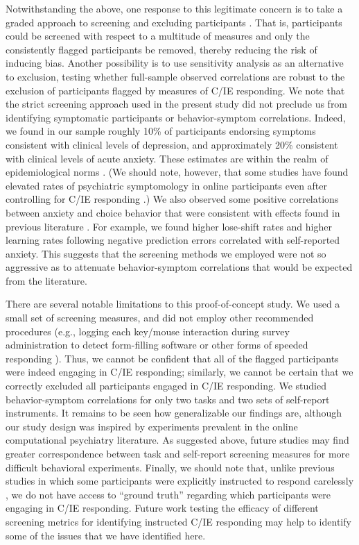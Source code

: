 \documentclass[a4paper,notitlepage,12pt]{article}
\begin{document}
Notwithstanding the above, one response to this legitimate concern is to take a graded approach to screening and excluding participants \cite{Kim2018-ev}. That is, participants could be screened with respect to a multitude of measures and only the consistently flagged participants be removed, thereby reducing the risk of inducing bias. Another possibility is to use sensitivity analysis as an alternative to exclusion, testing whether full-sample observed correlations are robust to the exclusion of participants flagged by measures of C/IE responding. We note that the strict screening approach used in the present study did not preclude us from identifying symptomatic participants or behavior-symptom correlations. Indeed, we found in our sample roughly 10\% of participants endorsing symptoms consistent with clinical levels of depression, and approximately 20\% consistent with clinical levels of acute anxiety. These estimates are within the realm of epidemiological norms \cite{kessler2012twelve, lowe2008validation, yarrington2021impact}. (We should note, however, that some studies have found elevated rates of psychiatric symptomology in online participants even after controlling for C/IE responding \cite{ophir2020turker}.) We also observed some positive correlations between anxiety and choice behavior that were consistent with effects found in previous literature \cite{huang2017computational, harle2017anhedonia, garrett2018updating}. For example, we found higher lose-shift rates and higher learning rates following negative prediction errors correlated with self-reported anxiety. This suggests that the screening methods we employed were not so aggressive as to attenuate behavior-symptom correlations that would be expected from the literature. 

There are several notable limitations to this proof-of-concept study. We used a small set of screening measures, and did not employ other recommended procedures (e.g., logging each key/mouse interaction during survey administration to detect form-filling software or other forms of speeded responding \cite{buchanan2018methods}). Thus, we cannot be confident that all of the flagged participants were indeed engaging in C/IE responding; similarly, we cannot be certain that we correctly excluded all participants engaged in C/IE responding. We studied behavior-symptom correlations for only two tasks and two sets of self-report instruments. It remains to be seen how generalizable our findings are, although our study design was inspired by experiments prevalent in the online computational psychiatry literature. As suggested above, future studies may find greater correspondence between task and self-report screening measures for more difficult behavioral experiments. Finally, we should note that, unlike previous studies in which some participants were explicitly instructed to respond carelessly \cite{buchanan2018methods}, we do not have access to ``ground truth'' regarding which participants were engaging in C/IE responding. Future work testing the efficacy of different screening metrics for identifying instructed C/IE responding may help to identify some of the issues that we have identified here.
\end{document}

